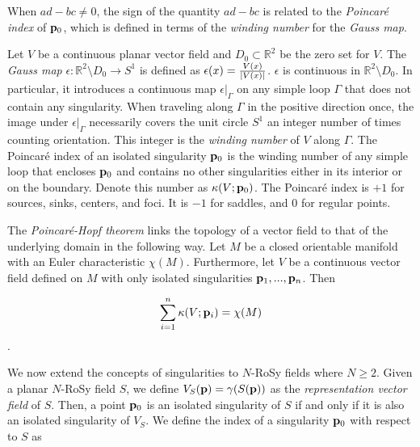 \documentclass{acmsiggraph}               %
\begin{document}
When $ad-bc \ne 0$, the sign of the quantity $ad-bc$ is related to
the {\em Poincar\'e index} of ${\bf p}_0$, which is defined in terms
of the {\em winding number} for the {\em Gauss map}.

Let $V$ be a continuous planar vector field and $D_0 \subset
\mathbb{R}^2$ be the zero set for $V$. The {\em Gauss map}
$\epsilon: \mathbb{R}^2 \setminus{D_0} \to S^1$ is defined as
$\epsilon(x) = \frac{V(x)}{\arrowvert V(x) \arrowvert}$. $\epsilon$
is continuous in $\mathbb{R}^2 \setminus{D_0}$. In particular, it
introduces a continuous map $\epsilon|_{\Gamma}$ on any simple loop
$\Gamma$ that does not contain any singularity. When traveling along
$\Gamma$ in the positive direction once, the image under
$\epsilon|_{\Gamma}$ necessarily covers the unit circle $S^1$ an
integer number of times counting orientation. This integer is the
{\em winding number} of $V$ along $\Gamma$. The Poincar\'e index of
an isolated singularity ${\bf p}_0$ is the winding number of any
simple loop that encloses ${\bf p}_0$ and contains no other
singularities either in its interior or on the boundary. Denote this
number as $\kappa(V;{\bf p}_0)$. The Poincar\'e index is $+1$ for
sources, sinks, centers, and foci. It is $-1$ for saddles, and $0$
for regular points.

The {\em Poincar\'{e}-Hopf theorem} links the topology of a vector
field to that of the underlying domain in the following way. Let $M$
be a closed orientable manifold with an Euler characteristic
$\chi(M)$. Furthermore, let $V$ be a continuous vector field defined
on $M$ with only isolated singularities ${\bf p}_1,..., {\bf p}_n$.
Then

\begin{equation}
\sum_{i=1}^{n}\kappa(V;{\bf p}_i)=\chi(M)
\end{equation}.
%

We now extend the concepts of singularities to $N$-RoSy fields where
$N \ge 2$. Given a planar $N$-RoSy field $S$, we define $V_S({\bf
p}) = \gamma (S({\bf p}))$ as the {\em representation vector field}
of $S$. Then, a point ${\bf p}_0$ is an isolated singularity of $S$
if and only if it is also an isolated singularity of $V_S$. We
define the index of a singularity ${\bf p}_0$ with respect to $S$ as
\end{document}
